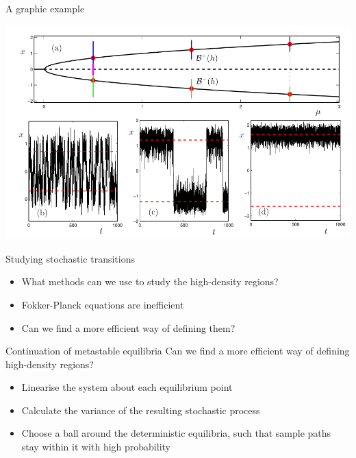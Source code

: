 \documentclass[presentation]{beamer}
\begin{document}
\begin{frame}[label={sec:orgfd0236c}]{A graphic example}
\begin{center}
\includegraphics[width=.9\linewidth]{./neighbourhoods.png}
\end{center}
\end{frame}
\begin{frame}[label={sec:org3246785}]{Studying stochastic transitions}
\begin{itemize}
\item What methods can we use to study the high-density regions?
\end{itemize}
\vfill
\begin{itemize}
\item Fokker-Planck equations are inefficient
\end{itemize}
\vfill
\begin{itemize}
\item Can we find a more efficient way of defining them?
\end{itemize}
\end{frame}

\begin{frame}[label={sec:org7b265a4}]{Continuation of metastable equilibria}
Can we find a more efficient way of defining high-density regions?
\vfill
\begin{itemize}
\item Linearise the system about each equilibrium point
\end{itemize}
\vfill
\begin{itemize}
\item Calculate the variance of the resulting stochastic process
\end{itemize}
\vfill
\begin{itemize}
\item Choose a ball around the deterministic equilibria, such that sample paths stay within it with high probability
\end{itemize}
\end{frame}
\end{document}
